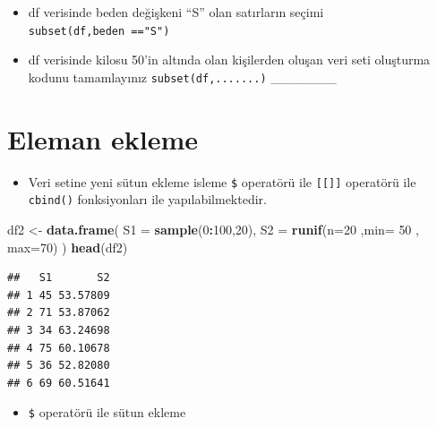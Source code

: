 \documentclass[
  oneside]{book}
\newenvironment{Shaded}{\begin{snugshade}}{\end{snugshade}}
\newcommand{\AttributeTok}[1]{\textcolor[rgb]{0.13,0.29,0.53}{#1}}
\newcommand{\ConstantTok}[1]{\textcolor[rgb]{0.56,0.35,0.01}{#1}}
\newcommand{\DecValTok}[1]{\textcolor[rgb]{0.00,0.00,0.81}{#1}}
\newcommand{\FunctionTok}[1]{\textcolor[rgb]{0.13,0.29,0.53}{\textbf{#1}}}
\newcommand{\NormalTok}[1]{#1}
\newcommand{\OtherTok}[1]{\textcolor[rgb]{0.56,0.35,0.01}{#1}}
\newcommand{\SpecialCharTok}[1]{\textcolor[rgb]{0.81,0.36,0.00}{\textbf{#1}}}
\providecommand{\tightlist}{%
  \setlength{\itemsep}{0pt}\setlength{\parskip}{0pt}}
\begin{document}
\begin{itemize}
\item
  df verisinde beden değişkeni ``S'' olan satırların seçimi \texttt{subset(df,beden\ =="S")}
\item
  df verisinde kilosu 50'in altında olan kişilerden oluşan veri seti oluşturma kodunu tamamlayınız \texttt{subset(df,.......)} \_\_\_\_\_\_\_
\end{itemize}

\hypertarget{eleman-ekleme}{%
\section{Eleman ekleme}\label{eleman-ekleme}}

\begin{itemize}
\tightlist
\item
  Veri setine yeni sütun ekleme isleme \texttt{\$} operatörü ile \texttt{{[}{[}{]}{]}} operatörü ile \texttt{cbind()} fonksiyonları ile yapılabilmektedir.
\end{itemize}

\begin{Shaded}
\begin{Highlighting}[]
\NormalTok{df2 }\OtherTok{\textless{}{-}} \FunctionTok{data.frame}\NormalTok{(}
      \AttributeTok{S1 =} \FunctionTok{sample}\NormalTok{(}\DecValTok{0}\SpecialCharTok{:}\DecValTok{100}\NormalTok{,}\DecValTok{20}\NormalTok{),}
      \AttributeTok{S2 =} \FunctionTok{runif}\NormalTok{(}\AttributeTok{n=}\DecValTok{20}\NormalTok{ ,}\AttributeTok{min=} \DecValTok{50}\NormalTok{ , }\AttributeTok{max=}\DecValTok{70}\NormalTok{)}
\NormalTok{)}
\FunctionTok{head}\NormalTok{(df2)}
\end{Highlighting}
\end{Shaded}

\begin{verbatim}
##   S1       S2
## 1 45 53.57809
## 2 71 53.87062
## 3 34 63.24698
## 4 75 60.10678
## 5 36 52.82080
## 6 69 60.51641
\end{verbatim}

\begin{itemize}
\tightlist
\item
  \texttt{\$} operatörü ile sütun ekleme
\end{itemize}

\begin{Shaded}
\end{Shaded}
\end{document}
